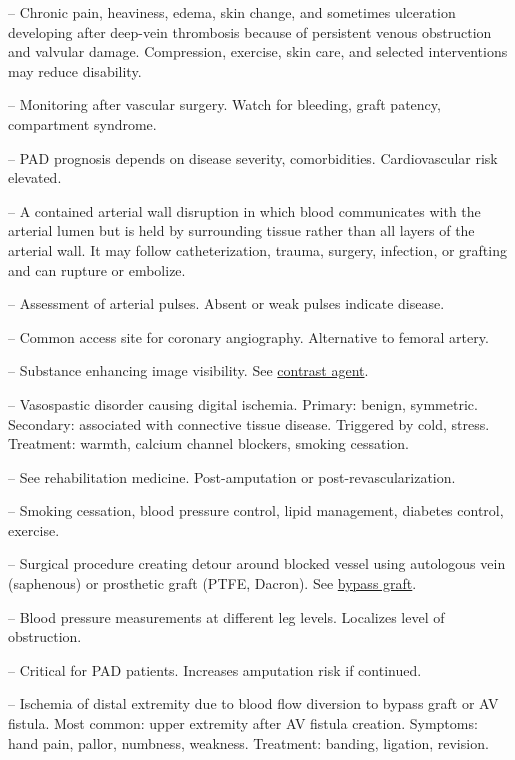 -- Chronic pain, heaviness, edema, skin change, and sometimes ulceration developing after deep-vein thrombosis because of persistent venous obstruction and valvular damage. Compression, exercise, skin care, and selected interventions may reduce disability.

-- Monitoring after vascular surgery. Watch for bleeding, graft patency, compartment syndrome.

-- PAD prognosis depends on disease severity, comorbidities. Cardiovascular risk elevated.

-- A contained arterial wall disruption in which blood communicates with the arterial lumen but is held by surrounding tissue rather than all layers of the arterial wall. It may follow catheterization, trauma, surgery, infection, or grafting and can rupture or embolize.

-- Assessment of arterial pulses. Absent or weak pulses indicate disease.

-- Common access site for coronary angiography. Alternative to femoral artery.

-- Substance enhancing image visibility. See \hyperlink{Contrast Agent}{contrast agent}.

-- Vasospastic disorder causing digital ischemia. Primary: benign, symmetric. Secondary: associated with connective tissue disease. Triggered by cold, stress. Treatment: warmth, calcium channel blockers, smoking cessation.

-- See rehabilitation medicine. Post-amputation or post-revascularization.

-- Smoking cessation, blood pressure control, lipid management, diabetes control, exercise.

-- Surgical procedure creating detour around blocked vessel using autologous vein (saphenous) or prosthetic graft (PTFE, Dacron). See \hyperlink{Bypass Graft}{bypass graft}.

-- Blood pressure measurements at different leg levels. Localizes level of obstruction.

-- Critical for PAD patients. Increases amputation risk if continued.

-- Ischemia of distal extremity due to blood flow diversion to bypass graft or AV fistula. Most common: upper extremity after AV fistula creation. Symptoms: hand pain, pallor, numbness, weakness. Treatment: banding, ligation, revision.

